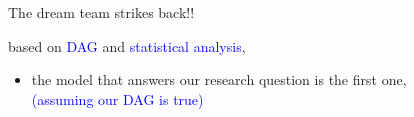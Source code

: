 %
%
\begin{lhframe}[rhgraphic={\texttt{[image: collider2\_reg1.png]}}]
	{The dream team strikes back!!}
	
	based on \textcolor{blue}{DAG} and \textcolor{blue}{statistical analysis},
	\begin{itemize}
		\item the model that answers our research question is the first one, \\
		{\small \textcolor{blue}{(assuming our DAG is true)} }
	\end{itemize}
\end{lhframe}
%
%